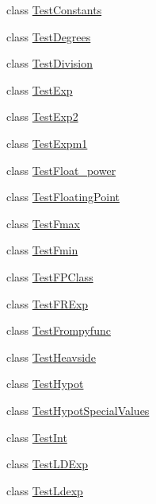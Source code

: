 \begin{DoxyCompactItemize}
\item 
class \hyperlink{classnumpy_1_1core_1_1tests_1_1test__umath_1_1TestConstants}{Test\+Constants}
\item 
class \hyperlink{classnumpy_1_1core_1_1tests_1_1test__umath_1_1TestDegrees}{Test\+Degrees}
\item 
class \hyperlink{classnumpy_1_1core_1_1tests_1_1test__umath_1_1TestDivision}{Test\+Division}
\item 
class \hyperlink{classnumpy_1_1core_1_1tests_1_1test__umath_1_1TestExp}{Test\+Exp}
\item 
class \hyperlink{classnumpy_1_1core_1_1tests_1_1test__umath_1_1TestExp2}{Test\+Exp2}
\item 
class \hyperlink{classnumpy_1_1core_1_1tests_1_1test__umath_1_1TestExpm1}{Test\+Expm1}
\item 
class \hyperlink{classnumpy_1_1core_1_1tests_1_1test__umath_1_1TestFloat__power}{Test\+Float\+\_\+power}
\item 
class \hyperlink{classnumpy_1_1core_1_1tests_1_1test__umath_1_1TestFloatingPoint}{Test\+Floating\+Point}
\item 
class \hyperlink{classnumpy_1_1core_1_1tests_1_1test__umath_1_1TestFmax}{Test\+Fmax}
\item 
class \hyperlink{classnumpy_1_1core_1_1tests_1_1test__umath_1_1TestFmin}{Test\+Fmin}
\item 
class \hyperlink{classnumpy_1_1core_1_1tests_1_1test__umath_1_1TestFPClass}{Test\+F\+P\+Class}
\item 
class \hyperlink{classnumpy_1_1core_1_1tests_1_1test__umath_1_1TestFRExp}{Test\+F\+R\+Exp}
\item 
class \hyperlink{classnumpy_1_1core_1_1tests_1_1test__umath_1_1TestFrompyfunc}{Test\+Frompyfunc}
\item 
class \hyperlink{classnumpy_1_1core_1_1tests_1_1test__umath_1_1TestHeavside}{Test\+Heavside}
\item 
class \hyperlink{classnumpy_1_1core_1_1tests_1_1test__umath_1_1TestHypot}{Test\+Hypot}
\item 
class \hyperlink{classnumpy_1_1core_1_1tests_1_1test__umath_1_1TestHypotSpecialValues}{Test\+Hypot\+Special\+Values}
\item 
class \hyperlink{classnumpy_1_1core_1_1tests_1_1test__umath_1_1TestInt}{Test\+Int}
\item 
class \hyperlink{classnumpy_1_1core_1_1tests_1_1test__umath_1_1TestLDExp}{Test\+L\+D\+Exp}
\item 
class \hyperlink{classnumpy_1_1core_1_1tests_1_1test__umath_1_1TestLdexp}{Test\+Ldexp}

\end{DoxyCompactItemize}
